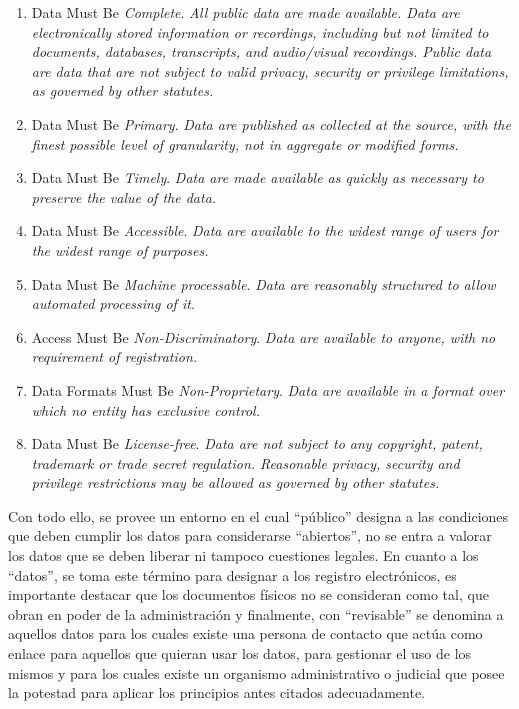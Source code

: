 \begin{enumerate}
 \item Data Must Be \textit{Complete}. \textit{All public data are made available. Data are electronically stored information or recordings, including but not limited to documents, databases, transcripts, and audio/visual recordings. Public data are data that are not subject to valid privacy, security or privilege limitations, as governed by other statutes.}
 \item Data Must Be \textit{Primary}. \textit{Data are published as collected at the source, with the finest possible level of granularity, not in aggregate or modified forms.}
 \item Data Must Be \textit{Timely}. \textit{Data are made available as quickly as necessary to preserve the value of the data.}
 \item Data Must Be \textit{Accessible}. \textit{Data are available to the widest range of users for the widest range of purposes.}
 \item Data Must Be \textit{Machine processable}. \textit{Data are reasonably structured to allow automated processing of it.}
 \item Access Must Be \textit{Non-Discriminatory}. \textit{Data are available to anyone, with no requirement of registration.}
 \item Data Formats Must Be \textit{Non-Proprietary}. \textit{Data are available in a format over which no entity has exclusive control.}
 \item Data Must Be \textit{License-free}. \textit{Data are not subject to any copyright, patent, trademark or trade secret regulation. Reasonable privacy, security and privilege restrictions may be allowed as governed by other statutes.}
\end{enumerate}

Con todo ello, se provee un entorno en el cual ``público'' designa a las condiciones que deben cumplir los datos
para considerarse ``abiertos'', no se entra a valorar los datos que se deben liberar ni tampoco cuestiones
legales. En cuanto a los ``datos'', se toma este término para designar a los registro electrónicos, es importante
destacar que los documentos físicos no se consideran como tal, que obran en poder de la administración y finalmente,
con ``revisable'' se denomina a aquellos datos para los cuales existe una persona de contacto que actúa como
enlace para aquellos que quieran usar los datos, para gestionar el uso de los mismos y para los cuales
existe un organismo administrativo o judicial que posee la potestad para aplicar los principios antes
citados adecuadamente.

